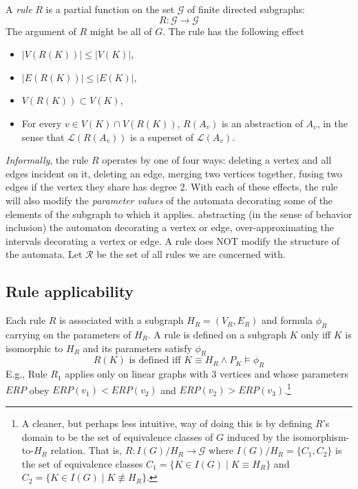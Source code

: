 \documentclass[11pt, oneside, reqno]{article}
\newcommand{\Gc}{\mathcal{G}}
\newcommand{\Lc}{\mathcal{L}}
\newcommand{\Rc}{\mathcal{R}}
\begin{document}
A \emph{rule} $R$ is a partial function on the set $\Gc$ of finite directed subgraphs:
\[R: \Gc \rightarrow \Gc\]
The argument of $R$ might be all of $G$.
The rule has the following effect
\begin{itemize}
	\item $|V(R(K))| \leq |V(K)|$,
	\item $|E(R(K))| \leq |E(K)|$,
	\item $V(R(K)) \subset V(K)$,
	\item For every $v \in V(K) \cap V(R(K))$, $R(A_v)$ is an abstraction of $A_v$, in the sense that $\Lc(R(A_v))$ is a superset of $\Lc(A_v)$.
\end{itemize}
\emph{Informally}, the rule $R$ operates by one of four ways: deleting a vertex and all edges incident on it, deleting an edge, merging two vertices together, fusing two edges if the vertex they share has degree 2.
With each of these effects, the rule will also modify the \emph{parameter values} of the automata decorating some of the elements of the subgraph to which it applies.
abstracting (in the sense of behavior inclusion) the automaton decorating a vertex or edge, over-approximating the intervals decorating a vertex or edge.
A rule does NOT modify the structure of the automata.
Let $\Rc$ be the set of all rules we are concerned with.

\subsection{Rule applicability}
\label{ruleApplicability}
Each rule $R$ is associated with a subgraph $H_R = (V_R,E_R)$ and formula $\phi_R$ carrying on the parameters of $H_R$.
A rule is defined on a subgraph $K$ only iff $K$ is isomorphic to $H_R$ and its parameters satisfy $\phi_R$
\begin{equation}
\label{eq:applicableR}
R(K) \textrm{ is defined iff } K \equiv H_R \land P_K \models \phi_R
\end{equation}
E.g., Rule $R_1$ applies only on linear graphs with 3 vertices and whose parameters $ERP$ obey $ERP(v_1) < ERP(v_2)$ and $ERP(v_2) > ERP(v_3)$.\footnote{A cleaner, but perhaps less intuitive, way of doing this is by defining $R$'s domain to be the set of equivalence classes of $G$ induced by the isomorphism-to-$H_R$ relation. 
	That is, $R: I(G)/H_R  \rightarrow \Gc$ where $I(G)/H_R = \{C_1,C_2\}$ is the set of equivalence classes $C_1 = \{K \in I(G) \;|\; K \equiv H_R \}$ and $C_2 = \{K \in I(G) \;|\; K \not \equiv H_R\}$.
}
\end{document}
